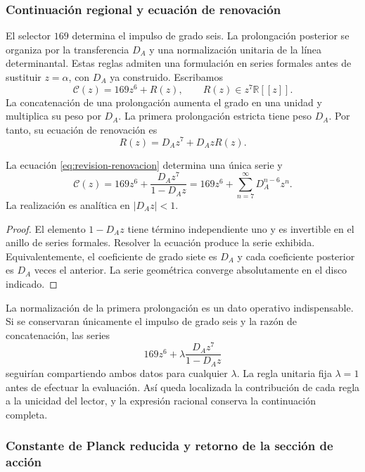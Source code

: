 \subsubsection{Continuación regional y ecuación de renovación}

El selector \(169\) determina el impulso de grado seis. La prolongación
posterior se organiza por la transferencia \(D_A\) y una normalización
unitaria de la línea determinantal. Estas reglas admiten una formulación
en series formales antes de sustituir \(z=\alpha\), con \(D_A\) ya
construido. Escribamos
\[
 \mathscr C(z)=169z^6+R(z),\qquad R(z)\in z^7\mathbb R[[z]].
\]
La concatenación de una prolongación aumenta el grado en una unidad y
multiplica su peso por \(D_A\). La primera prolongación estricta tiene
peso \(D_A\). Por tanto, su ecuación de renovación es
\begin{equation}
 R(z)=D_Az^7+D_AzR(z).
 \label{eq:revision-renovacion}
\end{equation}

\begin{proposition}
La ecuación \eqref{eq:revision-renovacion} determina una única serie y
\[
 \mathscr C(z)=169z^6+\frac{D_Az^7}{1-D_Az}
             =169z^6+\sum_{n=7}^{\infty}D_A^{n-6}z^n.
\]
La realización es analítica en \(|D_Az|<1\).
\end{proposition}
\begin{proof}
El elemento \(1-D_Az\) tiene término independiente uno y es invertible
en el anillo de series formales. Resolver la ecuación produce la serie
exhibida. Equivalentemente, el coeficiente de grado siete es \(D_A\)
y cada coeficiente posterior es \(D_A\) veces el anterior. La serie
geométrica converge absolutamente en el disco indicado.
\end{proof}

La normalización de la primera prolongación es un dato operativo
indispensable. Si se conservaran únicamente el impulso de grado seis y
la razón de concatenación, las series
\[
 169z^6+\lambda\frac{D_Az^7}{1-D_Az}
\]
seguirían compartiendo ambos datos para cualquier \(\lambda\).
La regla unitaria fija \(\lambda=1\) antes de efectuar la evaluación.
Así queda localizada la contribución de cada regla a la unicidad del
lector, y la expresión racional conserva la continuación completa.

\subsubsection{Constante de Planck reducida y retorno de la sección de acción}

